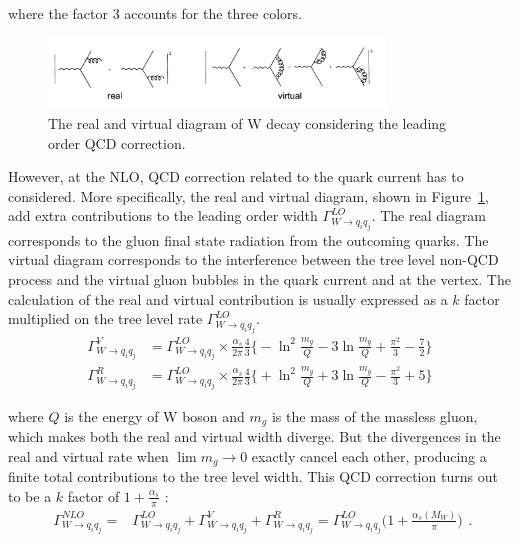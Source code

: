 \noindent  where the factor 3 accounts for the three colors.
\begin{figure}
    \centering
    \includegraphics[width=0.8\textwidth]{chapters/RelatedWorks/sectionVcs/figures/realVirtual.png}
    \caption{ The real and virtual diagram of W decay considering the leading order QCD correction. }
    \label{fig:relatedWorks:vcs:realVirtual}
\end{figure}

\noindent However, at the NLO, QCD correction related to the quark current has to considered. More specifically, the real and virtual diagram, shown in Figure~\ref{fig:relatedWorks:vcs:realVirtual}, add extra contributions to the leading order width $\Gamma_{W \to q_i q_j}^{LO} $. The real diagram corresponds to the gluon final state radiation from the outcoming quarks. The virtual diagram corresponds to the interference between the tree level non-QCD process and the virtual gluon bubbles in the quark current and at the vertex. The calculation of the real and virtual contribution is usually expressed as a $k$ factor multiplied on the tree level rate  $\Gamma_{W \to q_i q_j}^{LO} $.
 \begin{align}
 	\Gamma^V_{W \to q_i q_j}  &= \Gamma_{W \to q_i q_j}^{LO} \times \frac{\alpha_s}{2\pi}\frac{4}{3} \bigg \{  -\ln^2\frac{m_g}{Q} -3 \ln\frac{m_g}{Q} + \frac{\pi^2}{3}-\frac{7}{2} \bigg\} \\
    \Gamma^R_{W \to q_i q_j}  &= \Gamma_{W \to q_i q_j}^{LO} \times \frac{\alpha_s}{2\pi}\frac{4}{3} \bigg \{  +\ln^2\frac{m_g}{Q} + 3 \ln\frac{m_g}{Q} - \frac{\pi^2}{3}+ 5 \bigg\}
\end{align}
 
\noindent  where $Q$ is the energy of W boson and $m_g$ is the mass of the massless gluon, which makes both the real and virtual width diverge. But the divergences in the real and virtual rate when $\lim m_g \to 0$ exactly cancel each other, producing a finite total contributions to the tree level width. This QCD correction turns out to be a $k$ factor of $1+\frac{\alpha_s}{\pi}$ :
\begin{equation}
\begin{split}
    \Gamma_{W \to q_i q_j}^{NLO} =& \Gamma_{W \to q_i q_j}^{LO} + \Gamma^{V}_{W \to q_i q_j}  + \Gamma^{R}_{W \to q_i q_j}
            =   \Gamma_{W \to q_i q_j}^{LO} \big( 1+ \frac{\alpha_s(M_W)}{\pi}\big)
\end{split} .
\end{equation}

